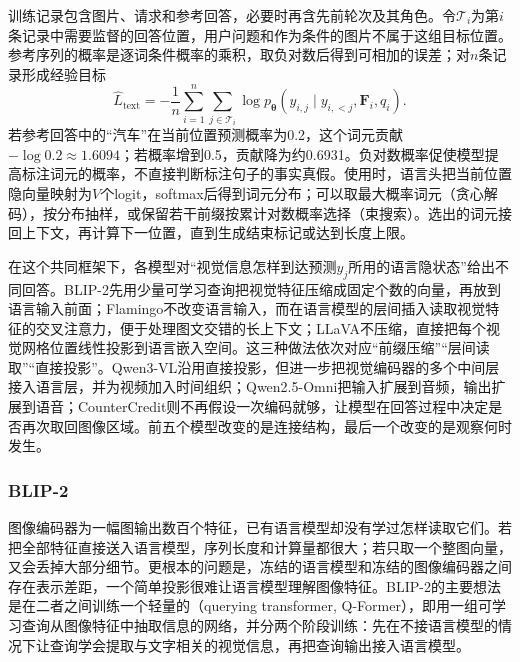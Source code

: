 训练记录包含图片、请求和参考回答，必要时再含先前轮次及其角色。令$\mathcal T_i$为第$i$条记录中需要监督的回答位置，用户问题和作为条件的图片不属于这组目标位置。参考序列的概率是逐词条件概率的乘积，取负对数后得到可相加的误差；对$n$条记录形成经验目标
\begin{equation}
  \widehat L_{\mathrm{text}}
   =-\frac1n\sum_{i=1}^n\sum_{j\in\mathcal T_i}
      \log p_{\bm\theta}(y_{i,j}\mid
          y_{i,<j},\bm F_i,q_i).
  \label{eq:vision-vlm-text-objective}
\end{equation}
若参考回答中的“汽车”在当前位置预测概率为0.2，这个词元贡献$-\log0.2\approx1.6094$；若概率增到0.5，贡献降为约0.6931。负对数概率促使模型提高标注词元的概率，不直接判断标注句子的事实真假。使用时，语言头把当前位置隐向量映射为$V$个logit，softmax后得到词元分布；可以取最大概率词元（贪心解码），按分布抽样，或保留若干前缀按累计对数概率选择（束搜索）。选出的词元接回上下文，再计算下一位置，直到生成结束标记或达到长度上限。

在这个共同框架下，各模型对“视觉信息怎样到达预测$y_j$所用的语言隐状态”给出不同回答。BLIP-2先用少量可学习查询把视觉特征压缩成固定个数的向量，再放到语言输入前面；Flamingo不改变语言输入，而在语言模型的层间插入读取视觉特征的交叉注意力，便于处理图文交错的长上下文；LLaVA不压缩，直接把每个视觉网格位置线性投影到语言嵌入空间。这三种做法依次对应“前缀压缩”“层间读取”“直接投影”。Qwen3-VL沿用直接投影，但进一步把视觉编码器的多个中间层接入语言层，并为视频加入时间组织；Qwen2.5-Omni把输入扩展到音频，输出扩展到语音；CounterCredit则不再假设一次编码就够，让模型在回答过程中决定是否再次取回图像区域。前五个模型改变的是连接结构，最后一个改变的是观察何时发生。

\subsubsection{BLIP-2}
\label{sec:vision-models-blip2}

图像编码器为一幅图输出数百个特征，已有语言模型却没有学过怎样读取它们。若把全部特征直接送入语言模型，序列长度和计算量都很大；若只取一个整图向量，又会丢掉大部分细节。更根本的问题是，冻结的语言模型和冻结的图像编码器之间存在表示差距，一个简单投影很难让语言模型理解图像特征。BLIP-2的主要想法是在二者之间训练一个轻量的（querying transformer, Q-Former），即用一组可学习查询从图像特征中抽取信息的网络，并分两个阶段训练：先在不接语言模型的情况下让查询学会提取与文字相关的视觉信息，再把查询输出接入语言模型。

